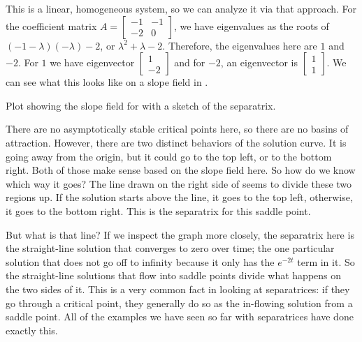 \begin{exampleSol}
This is a linear, homogeneous system, so we can analyze it via that approach. For the coefficient matrix $A = \left[ \begin{smallmatrix} -1 & -1 \\ -2 & 0 \end{smallmatrix} \right]$, we have eigenvalues as the roots of $(-1-\lambda)(-\lambda) - 2$, or $\lambda^2 + \lambda - 2$. Therefore, the eigenvalues here are $1$ and $-2$. For $1$ we have eigenvector $\left[ \begin{smallmatrix} 1 \\ -2 \end{smallmatrix}\right]$ and for $-2$, an eigenvector is $\left[ \begin{smallmatrix} 1 \\ 1 \end{smallmatrix}\right]$. We can see what this looks like on a slope field in .


\begin{mywrapfig}{3.3in}
\capstart
{}
\caption{Plot showing the slope field for  with a sketch of the separatrix. \label{fig:SepPlot}}
\end{mywrapfig}

There are no asymptotically stable critical points here, so there are no basins of attraction. However, there are two distinct behaviors of the solution curve. It is going away from the origin, but it could go to the top left, or to the bottom right. Both of those make sense based on the slope field here. So how do we know which way it goes? The line drawn on the right side of  seems to divide these two regions up. If the solution starts above the line, it goes to the top left, otherwise, it goes to the bottom right. This is the separatrix for this saddle point.

But what is that line? If we inspect the graph more closely, the separatrix here is the straight-line solution that converges to zero over time; the one particular solution that does not go off to infinity because it only has the $e^{-2t}$ term in it. So the straight-line solutions that flow into saddle points divide what happens on the two sides of it. This is a very common fact in looking at separatrices: if they go through a critical point, they generally do so as the in-flowing solution from a saddle point. All of the examples we have seen so far with separatrices have done exactly this.
\end{exampleSol}

